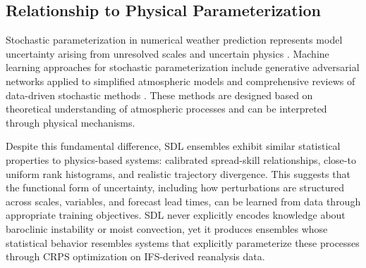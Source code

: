 \documentclass[11pt]{article}
\begin{document}


\subsection{Relationship to Physical Parameterization}

Stochastic parameterization in numerical weather prediction represents model uncertainty arising from unresolved scales and uncertain physics \cite{berner2017stochastic, palmer2009stochastic, palmer2019stochastic}. Machine learning approaches for stochastic parameterization include generative adversarial networks applied to simplified atmospheric models \cite{gagne2020machine} and comprehensive reviews of data-driven stochastic methods \cite{christensen2024machine}. These methods are designed based on theoretical understanding of atmospheric processes and can be interpreted through physical mechanisms. 

Despite this fundamental difference, SDL ensembles exhibit similar statistical properties to physics-based systems: calibrated spread-skill relationships, close-to uniform rank histograms, and realistic trajectory divergence. This suggests that the functional form of uncertainty, including how perturbations are structured across scales, variables, and forecast lead times, can be learned from data through appropriate training objectives. SDL never explicitly encodes knowledge about baroclinic instability or moist convection, yet it produces ensembles whose statistical behavior resembles systems that explicitly parameterize these processes through CRPS optimization on IFS-derived reanalysis data.
\end{document}
